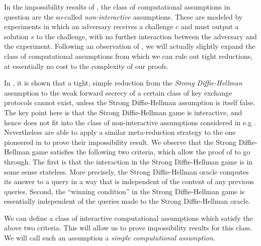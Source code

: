 In the impossibility results of , the class of computational assumptions
in question are the so-called \emph{non-interactive} assumptions.
These are modeled by experiments in which an adversary receives a challenge \(c\)
and must output a solution \(s\) to the challenge, with no further interaction between the adversary and the experiment.
Following an observation of , we will actually slightly expand the class of computational assumptions
from which we can rule out tight reductions, at essentially no cost to the complexity of our proofs.

In , it is shown that a tight, simple reduction from the \emph{Strong Diffie-Hellman} assumption
to the weak forward secrecy of a certain class of key exchange protocols cannot exist,
unless the Strong Diffie-Hellman assumption is itself false.
The key point here is that the Strong Diffie-Hellman game is interactive,
and hence does not fit into the class of non-interactive assumptions considered in e.g .
Nevertheless  are able to apply a similar meta-reduction strategy
to the one pioneered in  to prove their impossibility result.
We observe that the Strong Diffie-Hellman game satisfies the following two criteria,
which allow the proof of  to go through.
The first is that the interaction in the Strong Diffie-Hellman game is in some sense stateless.
More precisely, the Strong Diffie-Hellman oracle computes its answer to a query
in a way that is independent of the content of any previous queries.
Second, the ``winning condition'' in the Strong Diffie-Hellman game is essentially independent of
the queries made to the Strong Diffie-Hellman oracle.

We can define a class of interactive computational assumptions which satisfy the above two criteria.
This will allow us to prove impossibility results for this class.
We will call such an assumption a \emph{simple computational assumption}.


